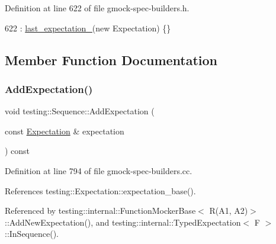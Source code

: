 Definition at line 622 of file gmock-\/spec-\/builders.\+h.


\begin{DoxyCode}
622 : \hyperlink{classtesting_1_1Sequence_a255551ecc8157f7f88cf6f58eb327419}{last\_expectation\_}(\textcolor{keyword}{new} Expectation) \{\}
\end{DoxyCode}


\subsection{Member Function Documentation}
\mbox{\label{classtesting_1_1Sequence_ac5b77b3b5b2e229ccbc13be1f3d17a9c}} 
\subsubsection{\texorpdfstring{Add\+Expectation()}{AddExpectation()}}
{\footnotesize\ttfamily void testing\+::\+Sequence\+::\+Add\+Expectation (\begin{DoxyParamCaption}\item[{const \hyperlink{classtesting_1_1Expectation}{Expectation} \&}]{expectation }\end{DoxyParamCaption}) const}



Definition at line 794 of file gmock-\/spec-\/builders.\+cc.



References testing\+::\+Expectation\+::expectation\+\_\+base().



Referenced by testing\+::internal\+::\+Function\+Mocker\+Base$<$ R(\+A1, A2)$>$\+::\+Add\+New\+Expectation(), and testing\+::internal\+::\+Typed\+Expectation$<$ F $>$\+::\+In\+Sequence().


